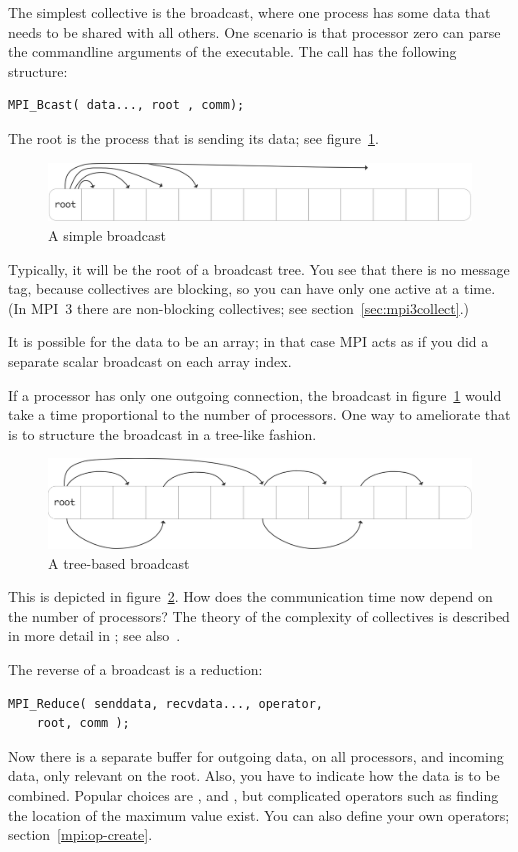 The simplest collective is the broadcast, where one process has some
data that needs to be shared with all others. One scenario is that
processor zero can parse the commandline arguments of the executable.
The call has the following structure:
\begin{verbatim}
MPI_Bcast( data..., root , comm);
\end{verbatim}
The root is the process that is sending its data; see figure~\ref{fig:bcast-simple}.
\begin{figure}[ht]
  \includegraphics[scale=.08]{graphics/bcast-simple}
  \caption{A simple broadcast}
  \label{fig:bcast-simple}
\end{figure}
Typically, it will
be the root of a broadcast tree. You see that there is no message tag,
because collectives are blocking, so you can have only one active at a
time. (In MPI~3 there are non-blocking collectives; see
section~\ref{sec:mpi3collect}.)

It is possible for the data to be an array; in that case MPI acts as if you did a 
separate scalar broadcast on each array index.

If a processor has only one outgoing connection, the broadcast in
figure~\ref{fig:bcast-simple} would take a time proportional to the
number of processors. One way to ameliorate that is to structure the
broadcast in a tree-like fashion.
\begin{figure}[ht]
  \includegraphics[scale=.1]{graphics/bcast-tree}
  \caption{A tree-based broadcast}
  \label{fig:bcast-tree}
\end{figure}
This is depicted in figure~\ref{fig:bcast-tree}. How does the
communication time now depend on the number of processors? The theory
of the complexity of collectives is described in more detail in
; see also~\cite{Chan2007Collective}.

The reverse of a broadcast is a reduction:
\begin{verbatim}
MPI_Reduce( senddata, recvdata..., operator,
    root, comm ); 
\end{verbatim}
Now there is a separate buffer for outgoing data, on all processors,
and incoming data, only relevant on the root. Also, you have to
indicate how the data is to be combined. Popular choices are
,  and
, but complicated operators such as finding the
location of the maximum value exist. You can also define your own
operators; section~\ref{mpi:op-create}.

